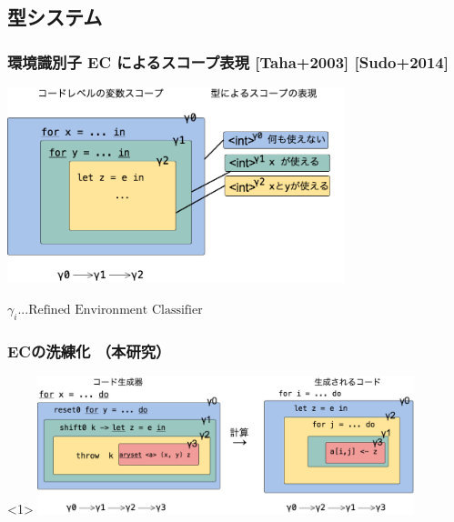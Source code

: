 
\subsection{型システム}

\begin{frame}
  \frametitle{環境識別子 EC によるスコープ表現 [Taha+2003] [Sudo+2014]}
  \begin{center}
    \includegraphics[clip,height=5.7cm]{./img/ec_for.png}
  \end{center}
  \begin{flushright}
    $\gamma_i ... \text{Refined Environment Classifier}$
  \end{flushright}
\end{frame}

\begin{frame}
  \frametitle{ECの洗練化 （本研究）}
  \begin{onlyenv}<1>
    \flushleft
    \includegraphics[clip,height=4cm]{./img/ecex.png}
  \end{onlyenv}
\end{frame}

